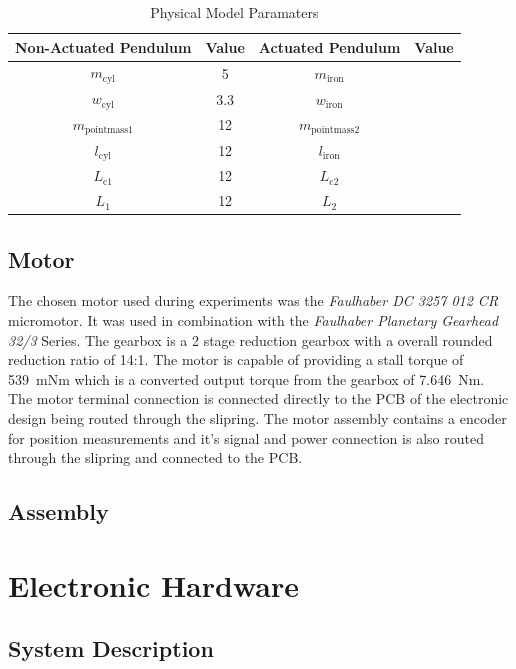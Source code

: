 \begin{table}[]
	\centering
	\begin{tabular}{|c|c|c|c|}
		\hline
		Non-Actuated Pendulum& Value & Actuated Pendulum & Value \\
		\hline
		\hline
		$m_{\text{cyl}}$ & \SI{5}{} & $m_{\text{iron}}$ &\\
		\hline
		$w_{\text{cyl}}$ & \SI{3.3}{}& $w_{\text{iron}}$& \\
		\hline
		$m_{\text{pointmass1}}$ & \SI{12}{}& $m_{\text{pointmass2}}$& \\
		\hline
		$l_{\text{cyl}}$ & \SI{12}{}& $l_{\text{iron}}$& \\
		\hline
		$L_{\text{c1}}$ & \SI{12}{} & $L_{\text{c2}}$&\\
		\hline
		$L_{1}$ & \SI{12}{}& $L_{2}$& \\
		\hline
	\end{tabular}
	\caption{Physical Model Paramaters}
	\label{table:model_param}
\end{table}


\subsection{Motor}
The chosen motor used during experiments was the \textit{Faulhaber DC 3257 012 CR} micromotor. It was used in combination with the \textit{Faulhaber Planetary Gearhead 32/3} Series. The gearbox is a 2 stage reduction gearbox with a overall rounded reduction ratio of 14:1. The motor is capable of providing a stall torque of \SI{539}{mNm} which is a converted output torque from the gearbox of \SI{7.646}{Nm}.\\

The motor terminal connection is connected directly to the PCB of the electronic design being routed through the slipring. The motor assembly contains a encoder for position measurements and it's signal and power connection is also routed through the slipring and connected to the PCB.
\subsection{Assembly}



\section{Electronic Hardware}
\subsection{System Description}

